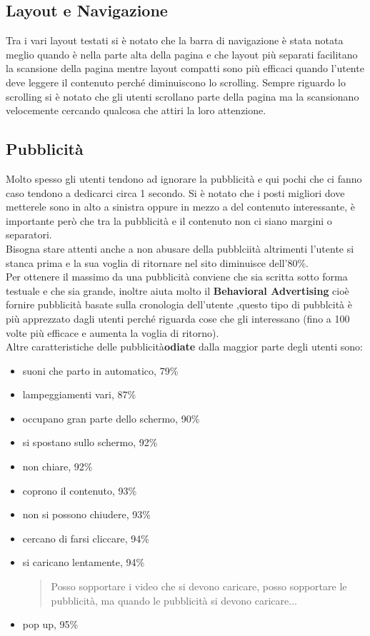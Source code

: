 \subsection{Layout e Navigazione}
Tra i vari layout testati si è notato che la barra di navigazione è stata notata meglio quando è nella parte alta della pagina e che layout più separati facilitano la scansione della pagina mentre layout compatti sono più efficaci quando l'utente deve leggere il contenuto perché diminuiscono lo scrolling.
Sempre riguardo lo scrolling si è notato che gli utenti scrollano parte della pagina ma la scansionano velocemente cercando qualcosa che attiri la loro attenzione.

\subsection{Pubblicità}
Molto spesso gli utenti tendono ad ignorare la pubblicità e qui pochi che ci fanno caso tendono a dedicarci circa 1 secondo.
Si è notato che i posti migliori dove metterele sono in alto a sinistra oppure in mezzo a del contenuto interessante, è importante però che tra la pubblicità e il contenuto non ci siano margini o separatori. \\
Bisogna stare attenti anche a non abusare della pubblciità altrimenti l'utente si stanca prima e la sua voglia di ritornare nel sito diminuisce dell'80\%.\\
Per ottenere il massimo da una pubblicità conviene che sia scritta sotto forma testuale e che sia grande, inoltre aiuta molto il \textbf{Behavioral Advertising} cioè fornire pubblicità basate sulla cronologia dell'utente ,questo tipo di pubblcità è più apprezzato dagli utenti perché riguarda cose che gli interessano (fino a 100 volte più efficace e aumenta la voglia di ritorno).\\
Altre caratteristiche delle pubblicità\textbf{odiate} dalla maggior parte degli utenti sono:
\begin{itemize}
\item suoni che parto in automatico, 79\%
\item lampeggiamenti vari, 87\%
\item occupano gran parte dello schermo, 90\%
\item si spostano sullo schermo, 92\%
\item non chiare, 92\%
\item coprono il contenuto, 93\%
\item non si possono chiudere, 93\%
\item cercano di farsi cliccare, 94\%
\item si caricano lentamente, 94\% \begin{quote}
Posso sopportare i video che si devono caricare, posso sopportare le pubblicità, ma quando le pubblicità si devono caricare...
\end{quote}
\item pop up, 95\%
\end{itemize}


